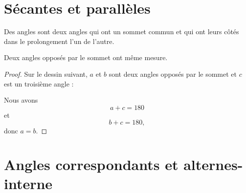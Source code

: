 
\section{Sécantes et parallèles}



\begin{definition}
    Des angles  sont deux angles qui ont un sommet commun et qui ont leurs côtés dans le prolongement l'un de l'autre.
\end{definition}

\begin{propriete}
    Deux angles opposés par le sommet ont même mesure.
    \begin{center}
        
    \end{center}
\end{propriete}

\begin{proof}
    Sur le dessin suivant, \( a\) et \(b\) sont deux angles opposés par le sommet et \( c\) est un troisième angle :

\begin{center}
    
\end{center}

Nous avons
\begin{equation}
    a+c=180
\end{equation}
et
\begin{equation}
    b+c=180,
\end{equation}
donc \( a=b\).

\end{proof}

\section{Angles correspondants et alternes-interne}

